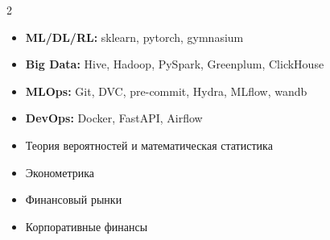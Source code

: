 \documentclass[9pt,a4paper,ragged2e]{altacv}
\begin{document}
\begin{paracol}{2}
\begin{itemize}[leftmargin=12pt]
    \item \textbf{ML/DL/RL:} sklearn, pytorch, gymnasium
    \item \textbf{Big Data:} Hive, Hadoop, PySpark, Greenplum, ClickHouse
    \item \textbf{MLOps:} Git, DVC, pre-commit, Hydra, MLflow, wandb
    \item \textbf{DevOps:} Docker, FastAPI, Airflow
\end{itemize}

\divider

\begin{itemize}[leftmargin=12pt]
    \item Теория вероятностей и математическая статистика
    \item Эконометрика
    \item Финансовый рынки
    \item Корпоративные финансы
\end{itemize}

\divider


\end{paracol}
\end{document}
